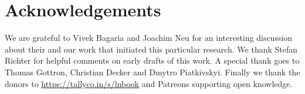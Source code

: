 \documentclass[a4paper]{paper}
\begin{document}
\section{Acknowledgements}
\label{sec:ack}
We are grateful to Vivek Bagaria and Joachim Neu for an interesting discussion about their and our work that initiated this particular research. We thank Stefan Richter for helpful comments on early drafts of this work. A special thank goes to Thomas Gottron, Christian Decker and Dmytro Piatkivskyi. Finally we thank the donors to \url{https://tallyco.in/s/lnbook} and Patreons supporting open knowledge. 



\end{document}
